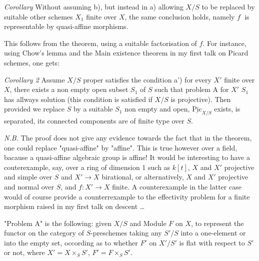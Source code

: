 \documentclass[11pt,a4paper]{article}
\begin{document}
\emph{Corollary} Without assuming b), but instead in a) allowing $X/S$ to be replaced by suitable other schemes $X_1$ finite over $X$, the same conclusion holds, namely $f^{\cdot}$ is representable by quasi-affine morphisms.

This follows from the theorem, using a suitable factorisation of $f$. For instance, using Chow's lemma and the Main existence theorem in my first talk on Picard schemes, one gets:

\emph{Corollary 2} Assume $X/S$ proper satisfies the condition a') for every $X'$ finite over $X$, there exists a non empty open subset $S_1$ of $S$ such that problem A for $X'$ $S_1$ has allways solution  (this condition is satisfied if $X/S$ is projective). Then provided we replace $S$ by a suitable $S_1$ non empty and open, $\underline{\mathrm{Pic}}_{X/S}$ exists, is separated, its connected components are of finite type over $S$.

\emph{N.B.} The proof does not give any evidence towards the fact that in the theorem, one could replace "quasi-affine" by "affine". This is true however over a field, bacause a quasi-affine algebraic group is affine! It would be interesting to have a couterexample, say, over a ring of dimension 1 such as $k[t]$, $X$ and $X'$ projective and simple over $S$ and $X' \to X$ birational, or alternatively, $X$ and $X'$ projective and normal over $S$, and $f\colon X' \to X$ finite. A counterexample in the latter case would of course provide a counterrexample to the effectivity problem for a finite morphism raised in my first talk on descent …

"Problem A" is the following: given $X/S$ and Module $F$ on $X$, to represent the functor on the category of $S$-preschemes taking any $S'/S$ into a one-element or into the empty set, occording as to whether $F'$ on $X'/S'$ is flat with respect to $S'$ or not, where $X' = X \times_S S'$, $F' = F \times_S S'$.
\end{document}
